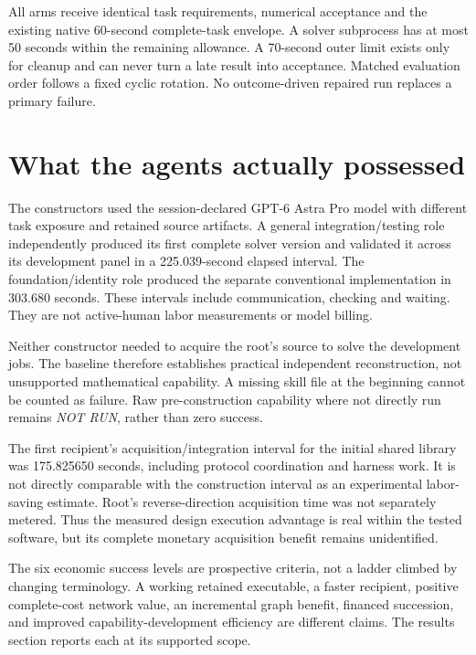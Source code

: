\documentclass[11pt,letterpaper]{article}
\begin{document}
All arms receive identical task requirements, numerical acceptance and the existing native 60-second complete-task envelope. A solver subprocess has at most 50 seconds within the remaining allowance. A 70-second outer limit exists only for cleanup and can never turn a late result into acceptance. Matched evaluation order follows a fixed cyclic rotation. No outcome-driven repaired run replaces a primary failure.

\section{What the agents actually possessed}

The constructors used the session-declared GPT-6 Astra Pro model with different task exposure and retained source artifacts. A general integration/testing role independently produced its first complete solver version and validated it across its development panel in a 225.039-second elapsed interval. The foundation/identity role produced the separate conventional implementation in 303.680 seconds. These intervals include communication, checking and waiting. They are not active-human labor measurements or model billing.

Neither constructor needed to acquire the root's source to solve the development jobs. The baseline therefore establishes practical independent reconstruction, not unsupported mathematical capability. A missing skill file at the beginning cannot be counted as failure. Raw pre-construction capability where not directly run remains \emph{NOT RUN}, rather than zero success.

The first recipient's acquisition/integration interval for the initial shared library was 175.825650 seconds, including protocol coordination and harness work. It is not directly comparable with the construction interval as an experimental labor-saving estimate. Root's reverse-direction acquisition time was not separately metered. Thus the measured design execution advantage is real within the tested software, but its complete monetary acquisition benefit remains unidentified.

The six economic success levels are prospective criteria, not a ladder climbed by changing terminology. A working retained executable, a faster recipient, positive complete-cost network value, an incremental graph benefit, financed succession, and improved capability-development efficiency are different claims. The results section reports each at its supported scope.
\end{document}

